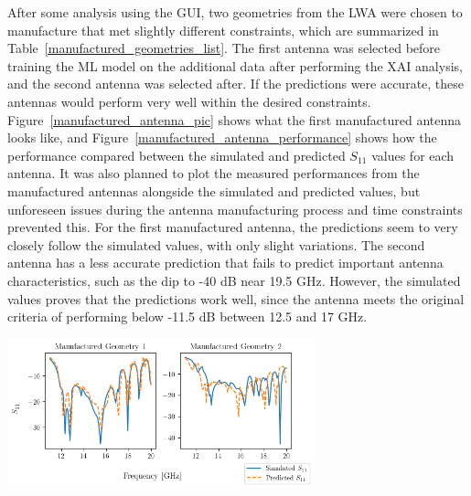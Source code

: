 \documentclass[conference]{IEEEtran}
\newenvironment{Figure}
    {\par\medskip\noindent\minipage{\linewidth}}
    {\endminipage\par\medskip}
\begin{document}
After some analysis using the GUI, two geometries from the LWA were chosen to manufacture that met slightly different constraints, which are summarized in Table~\ref{manufactured_geometries_list}. The first antenna was selected before training the ML model on the additional data after performing the XAI analysis, and the second antenna was selected after. If the predictions were accurate, these antennas would perform very well within the desired constraints. Figure~\ref{manufactured_antenna_pic} shows what the first manufactured antenna looks like, and Figure~\ref{manufactured_antenna_performance} shows how the performance compared between the simulated and predicted $S_{11}$ values for each antenna. It was also planned to plot the measured performances from the manufactured antennas alongside the simulated and predicted values, but unforeseen issues during the antenna manufacturing process and time constraints prevented this. For the first manufactured antenna, the predictions seem to very closely follow the simulated values, with only slight variations. The second antenna has a less accurate prediction that fails to predict important antenna characteristics, such as the dip to -40 dB near 19.5 GHz. However, the simulated values proves that the predictions work well, since the antenna meets the original criteria of performing below -11.5 dB between 12.5 and 17 GHz.

\begin{Figure}
    \centering
    \includegraphics[width=3.5in]{manufactured_antenna_performance}
    \label{manufactured_antenna_performance}
\end{Figure} 
\end{document}
